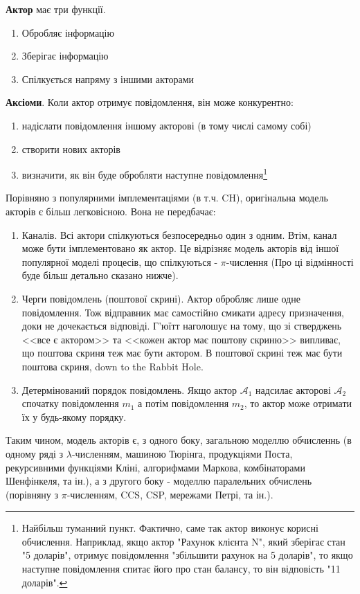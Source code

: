 \documentclass[12pt]{article}
\begin{document}
\textbf{Актор} має три функції.
\begin{enumerate}
    \item Обробляє інформацію
    \item Зберігає інформацію
    \item Спілкується напряму з іншими акторами
\end{enumerate}

\textbf{Аксіоми}. Коли актор отримує повідомлення, він може конкурентно:
\begin{enumerate}
    \item надіслати повідомлення іншому акторові (в тому числі самому собі)
    \item створити нових акторів
    \item визначити, як він буде обробляти наступне повідомлення\footnote{Найбільш туманний пункт. 
    Фактично, саме так актор виконує корисні обчислення. Наприклад, якщо актор "Рахунок клієнта N", який зберігає стан "5 доларів", отримує повідомлення "збільшити рахунок на 5 доларів", то якщо наступне повідомлення спитає його про стан балансу, то він відповість "11 доларів".}
\end{enumerate}

Порівняно з популярними імплементаціями (в т.ч. CH), оригінальна модель акторів є більш легковісною. Вона не передбачає:
\begin{enumerate}
    \item Каналів. Всі актори спілкуються безпосередньо один з одним. Втім, канал може бути імплементовано як актор. Це відрізняє модель акторів від іншої популярної моделі процесів, що спілкуються - $\pi$-числення (Про ці відмінності буде більш детально сказано нижче). 
    \item Черги повідомлень (поштової скрині). Актор обробляє лише одне повідомлення. Тож відправник має самостійно смикати адресу призначення, доки не дочекається відповіді. Г'юїтт наголошує на тому, що зі стверджень <<все є актором>> та <<кожен актор має поштову скриню>> випливає, що поштова скриня теж має бути актором. В поштової скрині теж має бути поштова скриня, down to the Rabbit Hole.
    \item Детермінований порядок повідомлень. Якщо актор $\mathcal{A}_1$ надсилає акторові $\mathcal{A}_2$ спочатку повідомлення $m_1$ а потім повідомлення $m_2$, то актор може отримати їх у будь-якому порядку. 
\end{enumerate}

Таким чином, модель акторів є, з одного боку, загальною моделлю обчисленнь (в одному ряді з $\lambda$-численням, машиною Тюрінга, продукціями Поста, рекурсивними функціями Кліні, алгорифмами Маркова, комбінаторами Шенфінкеля, та ін.), а з другого боку - моделлю паралельних обчислень (порівняну з $\pi$-численням, CCS, CSP, мережами Петрі, та ін.).\\
\end{document}
